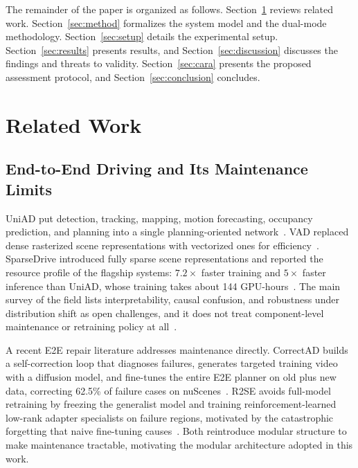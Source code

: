 \documentclass[conference]{IEEEtran}
\begin{document}
The remainder of the paper is organized as follows.
Section~\ref{sec:related} reviews related work.
Section~\ref{sec:method} formalizes the system model and the dual-mode
methodology. Section~\ref{sec:setup} details the experimental setup.
Section~\ref{sec:results} presents results, and
Section~\ref{sec:discussion} discusses the findings and threats to validity.
Section~\ref{sec:cara} presents the proposed assessment protocol, and
Section~\ref{sec:conclusion} concludes.

\section{Related Work}
\label{sec:related}

\subsection{End-to-End Driving and Its Maintenance Limits}
UniAD put detection, tracking, mapping, motion forecasting, occupancy
prediction, and planning into a single planning-oriented
network~\cite{hu2023uniad}. VAD replaced dense rasterized scene
representations with vectorized ones for efficiency~\cite{jiang2023vad}.
SparseDrive introduced fully sparse scene representations and reported the
resource profile of the flagship systems: $7.2\times$ faster training and
$5\times$ faster inference than UniAD, whose training takes about 144
GPU-hours~\cite{sun2024sparsedrive}. The main survey of the field lists
interpretability, causal confusion, and robustness under distribution shift
as open challenges, and it does not treat component-level maintenance or
retraining policy at all~\cite{chen2024e2esurvey}.

A recent E2E repair literature addresses maintenance directly. CorrectAD
builds a self-correction loop that diagnoses failures, generates targeted
training video with a diffusion model, and fine-tunes the entire E2E planner
on old plus new data, correcting 62.5\% of failure cases on
nuScenes~\cite{ma2025correctad}. R2SE avoids full-model retraining by freezing
the generalist model and training reinforcement-learned low-rank adapter
specialists on failure regions, motivated by the catastrophic forgetting that
naive fine-tuning causes~\cite{liu2025r2se}. Both reintroduce modular structure
to make maintenance tractable, motivating the modular architecture adopted in
this work.
\end{document}
